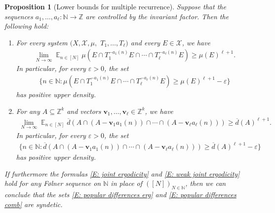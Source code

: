 \documentclass[11pt]{amsart}
\newtheorem{proposition}[lemma]{Proposition}
\theoremstyle{definition}
\DeclareMathOperator*{\E}{\mathbb{E}}
\newcommand{\N}{{\mathbb N}}
\newcommand{\Z}{{\mathbb Z}}
\newcommand{\CX}{{\mathcal X}}
\newcommand{\bv}{{\mathbf{v}}}
\newcommand{\veps}{\varepsilon}
\newcommand{\1}{{\mathbf{1}}}
\newcommand{\BK}[1]{{\color{Apricot}{{#1}}}}
\begin{document}
\begin{proposition}[Lower bounds for multiple recurrence]\label{P: recurrence for jointly ergodic}
Suppose that the sequences $a_1, \ldots, a_\ell:\N\to\Z$ are controlled by the invariant factor. Then the following hold:
\begin{enumerate}
	\item For every system $(X, \CX, \mu,$\! $T_1, \ldots, T_\ell)$ and every $E\in\CX$, we have
	\begin{align*}
	\lim_{N\to\infty}\E_{n\in[N]}\mu(E\cap T_1^{-{a_1(n)}}E\cap \cdots \cap T_\ell^{-{a_\ell(n)}}E) \geq \mu(E)^{\ell+1}.
	\end{align*}
 In particular, for every $\veps>0$, the set
 \begin{align}\label{E: popular differences erg}
 	\{n\in\N\colon \mu(E\cap T_1^{-{a_1(n)}}E\cap \cdots \cap T_\ell^{-{a_\ell(n)}}E) \geq \mu(E)^{\ell+1} - \veps\}
 \end{align}
 has positive upper density.
\item For any $A\subseteq\Z^k$ 
    and vectors $\bv_1, \ldots, \bv_\ell\in\Z^k$, we have
	\begin{align*}
		\lim_{N\to\infty}\E_{n\in[N]}\overline{d}(A\cap (A - \bv_1{a_1(n)})\cap \cdots \cap (A - \bv_\ell{a_\ell(n)})) \geq \overline{d}(A)^{\ell+1}.
	\end{align*}
        In particular, for every $\veps>0$, the set
 \begin{align}\label{E: popular differences comb}
 	\{n\in\N\colon \overline{d}(A\cap (A - \bv_1{a_1(n)})\cap \cdots \cap (A - \bv_\ell{a_\ell(n)})) \geq \overline{d}(A)^{\ell+1} - \veps\}
 \end{align}
 has positive upper density.
\end{enumerate}

If furthermore the formulas \eqref{E: joint ergodicity} and \eqref{E: weak joint ergodicity} hold for any F{\o}lner sequence on $\N$ in place of $([N])_{N\in\N}$, then we can conclude that the sets \eqref{E: popular differences erg} and \eqref{E: popular differences comb} are syndetic. 
\end{proposition}
\end{document}
